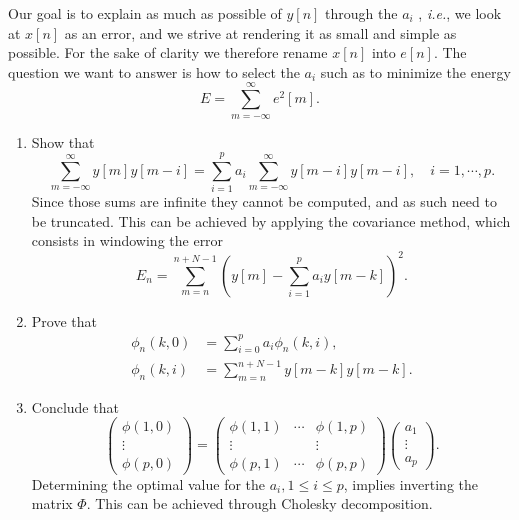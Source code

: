 Our goal is to explain as much as possible of \(y[n]\) through the $a_i$ , \textit{i.e.}, we look at \(x[n]\) as an error, and we strive at rendering it as small and simple as possible.\cite{gtm135}
For the sake of clarity we therefore rename \(x[n]\) into \(e[n]\).\cite{cc12}
The question we want to answer is how to select the $a_i$ such as to minimize the energy
\begin{equation}
E=\sum_{m=-\infty}^\infty e^2[m].
\end{equation}


\begin{enumerate}
	\item Show that
	\begin{equation}
	\sum_{m=-\infty}^{\infty} y[m]y[m-i]=\sum_{i=1}^p a_i\sum_{m=-\infty}^{\infty} y[m-i]y[m-i], \quad i=1,\cdots,p.
	\end{equation}
	Since those sums are infinite they cannot be computed, and as such need to be truncated.\cite{karris}
	This can be achieved by applying the covariance method, which consists in windowing the error
	\begin{equation}
	E_n=\sum_{m=n}^{n+N-1}\left(y[m]-\sum_{i=1}^p a_i y[m-k] \right)^2.
	\end{equation}
	\item Prove that
	\begin{align*}
	\phi_n(k,0)&=\sum_{i=0}^p a_i\phi_n(k,i), \\
	\phi_n(k,i)&=\sum_{m=n}^{n+N-1} y[m-k]y[m-k].
	\end{align*}
	\item Conclude that
	\begin{equation}
	\begin{pmatrix} \phi(1,0)\\ \vdots \\ \phi(p,0) \end{pmatrix}=\begin{pmatrix} \phi(1,1) & \cdots & \phi(1,p) \\ \vdots & & \vdots \\ \phi(p,1) & \cdots & \phi(p,p) \end{pmatrix}\begin{pmatrix} a_1 \\ \vdots \\ a_p \end{pmatrix}.
	\end{equation}
	Determining the optimal value for the \(a_i, 1\leq i\leq p\), implies inverting the matrix $\Phi$.
	This can be achieved through Cholesky decomposition.\cite{gtm216,gtm135}
\end{enumerate}


